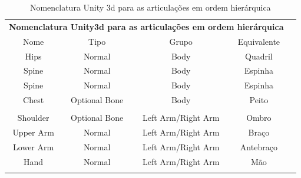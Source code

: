 \begin{table}[]
\centering
\caption{Nomenclatura Unity 3d para as articulações em ordem hierárquica}
\label{nomenclaturaUnity3d}
\begin{tabular}{|c|c|c|c|c}
\cline{1-4}
\multicolumn{4}{|c|}{\cellcolor[HTML]{9B9B9B}\textbf{Nomenclatura Unity3d para as articulações em ordem hierárquica}}             &  \\ \cline{1-4}
\cellcolor[HTML]{C0C0C0}Nome & \cellcolor[HTML]{C0C0C0}Tipo & \cellcolor[HTML]{C0C0C0}Grupo & \cellcolor[HTML]{C0C0C0}Equivalente &  \\ \cline{1-4}
Hips                         & Normal                       & Body                          & Quadril                             &  \\ \cline{1-4}
Spine                        & Normal                       & Body                          & Espinha                             &  \\ \cline{1-4}
Spine                        & Normal                       & Body                          & Espinha                             &  \\ \cline{1-4}
Chest                        & Optional Bone                & Body                          & Peito                               &  \\ \cline{1-4}
                             &                              &                               &                                     &  \\ \cline{1-4}
Shoulder                     & Optional Bone                & Left Arm/Right Arm            & Ombro                               &  \\ \cline{1-4}
Upper Arm                    & Normal                       & Left Arm/Right Arm            & Braço                               &  \\ \cline{1-4}
Lower Arm                    & Normal                       & Left Arm/Right Arm            & Antebraço                           &  \\ \cline{1-4}
Hand                         & Normal                       & Left Arm/Right Arm            & Mão                                 &  \\ \cline{1-4}
                             &                              &                               &                                     &  \\ \cline{1-4}

\end{tabular}
\end{table}
